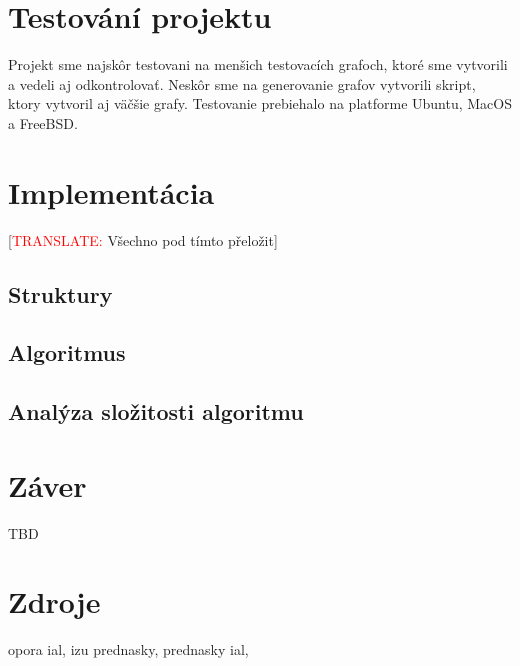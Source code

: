 \documentclass[a4paper,11pt]{article}
\begin{document}
\section{Testování projektu}
Projekt sme najskôr testovani na menšich testovacích grafoch, ktoré sme vytvorili a vedeli aj odkontrolovať. Neskôr sme na generovanie grafov vytvorili skript, ktory vytvoril aj väčšie grafy. Testovanie prebiehalo na platforme Ubuntu, MacOS a FreeBSD.

\section{Implementácia}
[\textcolor{red}{TRANSLATE: }Všechno pod tímto přeložit]
\subsection{Struktury}
\subsection{Algoritmus}
\subsection{Analýza složitosti algoritmu}

\section{Záver}
TBD

\section{Zdroje}
opora ial,
izu prednasky,
prednasky ial, 
\end{document}
